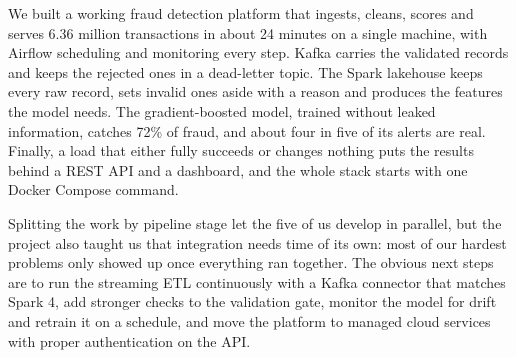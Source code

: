 \documentclass[11pt,a4paper]{article}
\begin{document}
We built a working fraud detection platform that ingests, cleans, scores and
serves 6.36 million transactions in about 24 minutes on a single machine, with
Airflow scheduling and monitoring every step. Kafka carries the validated records
and keeps the rejected ones in a dead-letter topic. The Spark lakehouse keeps every
raw record, sets invalid ones aside with a reason and produces the features the
model needs. The gradient-boosted model, trained without leaked information,
catches 72\% of fraud, and about four in five of its alerts are real. Finally, a
load that either fully succeeds or changes nothing puts the results behind a REST
API and a dashboard, and the whole stack starts with one Docker Compose command.

Splitting the work by pipeline stage let the five of us develop in parallel, but
the project also taught us that integration needs time of its own: most of our
hardest problems only showed up once everything ran together. The obvious next
steps are to run the streaming ETL continuously with a Kafka connector that
matches Spark 4, add stronger checks to the validation gate, monitor the model for
drift and retrain it on a schedule, and move the platform to managed cloud
services with proper authentication on the API.
\end{document}
